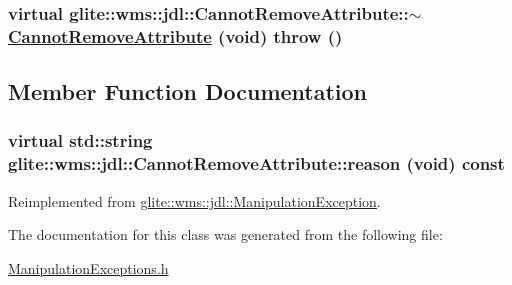 \hypertarget{classglite_1_1wms_1_1jdl_1_1CannotRemoveAttribute_a1}{
\subsubsection[$\sim$CannotRemoveAttribute]{\setlength{\rightskip}{0pt plus 5cm}virtual glite::wms::jdl::Cannot\-Remove\-Attribute::$\sim$\hyperlink{classglite_1_1wms_1_1jdl_1_1CannotRemoveAttribute}{Cannot\-Remove\-Attribute} (void)  throw ()}}
\label{classglite_1_1wms_1_1jdl_1_1CannotRemoveAttribute_a1}




\subsection{Member Function Documentation}
\hypertarget{classglite_1_1wms_1_1jdl_1_1CannotRemoveAttribute_a2}{
\subsubsection[reason]{\setlength{\rightskip}{0pt plus 5cm}virtual std::string glite::wms::jdl::Cannot\-Remove\-Attribute::reason (void) const}}
\label{classglite_1_1wms_1_1jdl_1_1CannotRemoveAttribute_a2}




Reimplemented from \hyperlink{classglite_1_1wms_1_1jdl_1_1ManipulationException_a4}{glite::wms::jdl::Manipulation\-Exception}.

The documentation for this class was generated from the following file:\begin{CompactItemize}
\item 
\hyperlink{ManipulationExceptions_8h}{Manipulation\-Exceptions.h}\end{CompactItemize}
